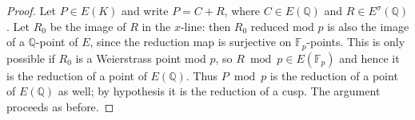 \documentclass[10pt,a4paper]{amsart}
\def\Q{{\mathbb Q}}
\def\F{{\mathbb F}}
\begin{document}
\begin{proof} Let $P \in E(K)$ and write $P = C + R$, where $C \in E(\Q)$
  and $R \in E^\sigma(\Q)$.  Let $R_0$ be the
  image of $R$ in the $x$-line: then $R_0$ reduced mod $p$ is also the image of
  a $\Q$-point of $E$, since the reduction map is surjective on $\F_p$-points.
  This is only possible if $R_0$ is a Weierstrass point mod $p$, so 
  $R \bmod p \in E(\F_p)$ and hence it is the reduction of a point of $E(\Q)$.
  Thus $P \bmod p$ is the reduction of a point of $E(\Q)$ as well; by hypothesis
  it is the reduction of a cusp.  The argument proceeds as before.
\end{proof}
\end{document}
